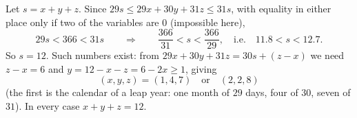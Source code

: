 Let $s=x+y+z$. Since $29s\le29x+30y+31z\le31s$, with equality in either place only if two of the variables are $0$ (impossible here),
\[
29s<366<31s\qquad\Longrightarrow\qquad \dfrac{366}{31}<s<\dfrac{366}{29},\quad\text{i.e.}\quad 11.8<s<12.7 .
\]
So $s=12$. Such numbers exist: from $29x+30y+31z=30s+(z-x)$ we need $z-x=6$ and $y=12-x-z=6-2x\ge1$, giving
\[
(x,y,z)=(1,4,7)\quad\text{or}\quad(2,2,8)
\]
(the first is the calendar of a leap year: one month of $29$ days, four of $30$, seven of $31$). In every case $x+y+z=\boxed{12}$.
